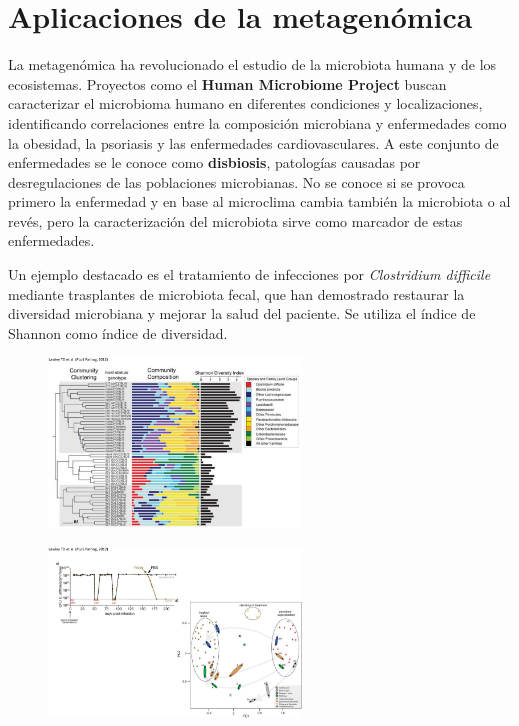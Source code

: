 \section{Aplicaciones de la metagenómica}
La metagenómica ha revolucionado el estudio de la microbiota humana y de los ecosistemas. Proyectos como el \textbf{Human Microbiome Project} buscan caracterizar el microbioma humano en diferentes condiciones y localizaciones, identificando correlaciones entre la composición microbiana y enfermedades como la obesidad, la psoriasis y las enfermedades cardiovasculares. A este conjunto de enfermedades se le conoce como \textbf{disbiosis}, patologías causadas por desregulaciones de las poblaciones microbianas. No se conoce si se provoca primero la enfermedad y en base al microclima cambia también la microbiota o al revés, pero la caracterización del microbiota sirve como marcador de estas enfermedades.

Un ejemplo destacado es el tratamiento de infecciones por \textit{Clostridium difficile} mediante trasplantes de microbiota fecal, que han demostrado restaurar la diversidad microbiana y mejorar la salud del paciente. Se utiliza el índice de Shannon como índice de diversidad.

\begin{figure}[h]
\centering
\includegraphics[width = 0.6\textwidth]{figs/c-difficile-1.png}
\end{figure}

\begin{figure}[h]
\centering
\includegraphics[width = 0.6\textwidth]{figs/c-difficile-2.png}
\end{figure}

